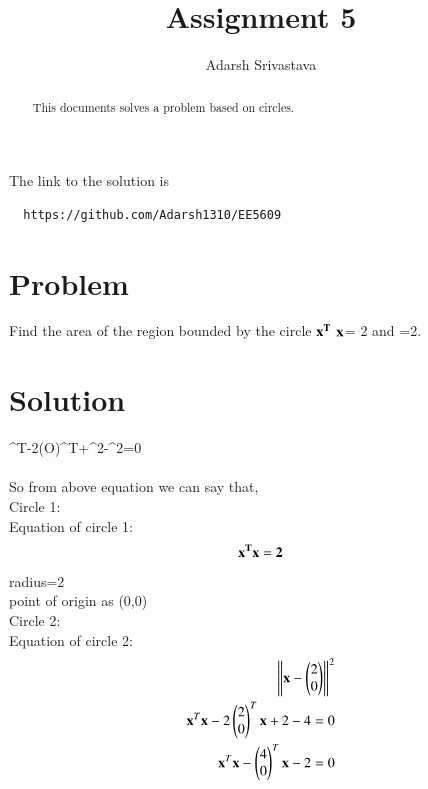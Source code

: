 \documentclass[journal,12pt,twocolumn]{IEEEtran}
\begin{document}
      \def\rightbox#1{\makebox[0in][r]{#1}}
      \def\centbox#1{\makebox[0in]{#1}}
      \def\topbox#1{\raisebox{-\baselineskip}[0in][0in]{#1}}
      \def\midbox#1{\raisebox{-0.5\baselineskip}[0in][0in]{#1}}
 \vspace{3cm}
 \title{Assignment 5}
 \author{Adarsh Srivastava}
 \maketitle
 \newpage
 \bigskip
 \renewcommand{\thetable}{\theenumi}
 The link to the solution is
 \begin{lstlisting}
  https://github.com/Adarsh1310/EE5609
 \end{lstlisting}
 \begin{abstract}
 This documents solves a problem based on circles.
 \end{abstract}
 \section{\textbf{Problem}}
Find the area of the region bounded by the circle $\bf{x}^{T}$ $\bf{x}$= 2 and =2.
 \section{\textbf{Solution}}
^{T}-2\vec(O)^{T}+^2-^2=0\\
 
 \\
 So from above equation we can say that,\\
 Circle 1:\\
 Equation of circle 1:\\
 \begin{align}
 \bf{x}^{T}\bf{x}= 2
 \end{align}
 radius=2\\
 point of origin as (0,0)\\ 
 Circle 2:\\
 Equation of circle 2:\\
\begin{align}
  \left\lVert\mathbf{x}-\begin{pmatrix}2\\0\end{pmatrix}\right\rVert^2\\
  {\mathbf{x}^{T}\mathbf{x}-2\begin{pmatrix}2\\0\end{pmatrix}^T\mathbf{x}}+2-4=0\\
  {\mathbf{x}^{T}\mathbf{x}-\begin{pmatrix}4\\0\end{pmatrix}^T\mathbf{x}}-2=0
  \end{align}
\end{document}
